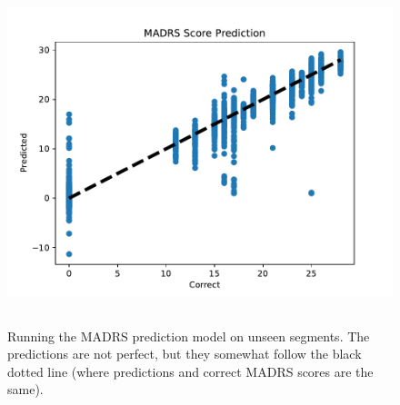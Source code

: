 \begin{figure}
\begin{center}
      \includegraphics[height=10cm]{img/madrs_prediction/predictions.pdf}
      \caption{Running the MADRS prediction model on unseen segments. The predictions are not perfect, but they somewhat follow the black dotted line (where predictions and correct MADRS scores are the same).}
      \label{figure:madrs_prediction_testset}
\end{center}
\end{figure}

